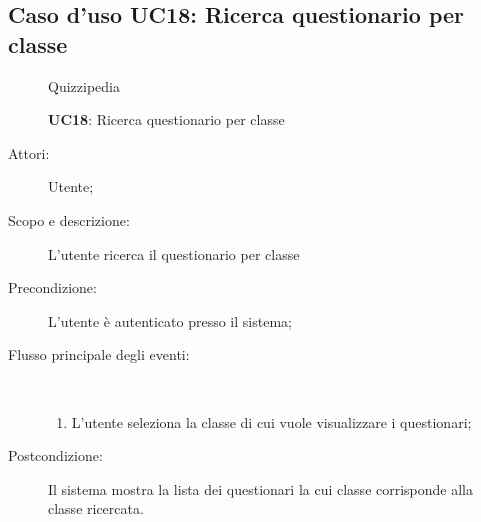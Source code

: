 \subsection{Caso d'uso UC18: Ricerca questionario per classe}
	\begin{figure}[H]
		\centering
		\begin{resizedtikzpicture}{\textwidth}
		\begin{umlsystem}[x=0, fill=lightgray!20]{Quizzipedia}
		\end{umlsystem}
		\end{resizedtikzpicture}
		\caption{\textbf{UC18}: Ricerca questionario per classe}
		\label{UC18}
	\end{figure}
\begin{description}
\item[Attori:] Utente;
\item[Scopo e descrizione:] L'utente ricerca il questionario per classe
      \item[Precondizione:] L'utente è autenticato presso il sistema;

        \item[Flusso principale degli eventi:] \ 
 \begin{enumerate}
          \item L'utente seleziona la classe di cui vuole visualizzare i questionari;

      \end{enumerate}
    \item[Postcondizione:] Il sistema mostra la lista dei questionari la cui classe corrisponde alla classe ricercata.
  \end{description}
\hypertarget{UC19}{}
